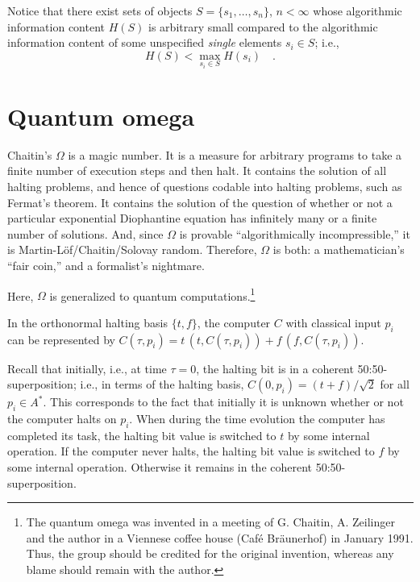 Notice
that there exist sets of objects
$S=\{s_1,\ldots
,s_n\}$, $n<\infty$
whose algorithmic information content $H(S)$ is arbitrary small compared
to the algorithmic information content of some unspecified {\em single}
elements $s_i\in S$; i.e.,
\begin{equation}
H(S)<\max_{s_i\in S}H(s_i)\quad .
\end{equation}



\section{Quantum omega}
Chaitin's $\Omega$ \cite{chaitin2,chaitin3,solovai,calude:94} is a magic
number.
It is a measure for arbitrary programs to take a finite number of
execution steps and
then halt.
It contains the solution of all halting problems, and hence of
questions codable into halting problems, such as Fermat's theorem.
It contains the solution of the question of whether or not a particular
exponential Diophantine equation
has infinitely many or a finite number of solutions.
And, since $\Omega$ is provable ``algorithmically incompressible,'' it
is Martin-L\"of/Chaitin/Solovay random. Therefore, $\Omega$ is both: a
mathematician's ``fair coin,''  and a formalist's nightmare.

Here, $\Omega$ is generalized to quantum computations.\footnote{The
quantum omega was invented in a meeting of G. Chaitin,
A. Zeilinger and the author in a Viennese coffee house
(Caf\'{e} Br\"aunerhof) in January 1991.
Thus, the group should be credited for the original invention,
whereas any blame should remain with the author.}


In the orthonormal halting basis $\{ t  ,f
\}$,
the computer $C$ with
classical input
$p_i$ can be represented by
$
C(\tau ,p_i)    = t
\,(
t,
 C(\tau ,p_i))
+
f\,(f,C(\tau ,p_i))$.

Recall
that initially,
i.e., at time $\tau =0$, the halting bit
is in a coherent 50:50-superposition; i.e.,
in terms of the halting basis,
$C(0,p_i)    =
( t+f)/ \sqrt{2}$
for all $p_i\in A^\ast$.
This corresponds to the fact that initially it is unknown whether or not
the computer halts on $p_i$.
When during the time evolution the  computer has completed its task,
the halting bit value is switched to $t$
by some internal operation.
If the computer never halts,
the halting bit value is switched to $f$
by some internal operation.
Otherwise it
remains in the  coherent 50:50-superposition.

